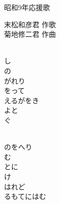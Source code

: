 \documentclass[10pt,b5j]{tarticle} %
\begin{document}
\begin{minipage}[c]{0.7\hsize} %
    \begin{center}
        {\LARGE
            昭和9年応援歌 %
        }
        {\small 
        }
    \end{center}
\end{minipage}
\begin{minipage}[c]{0.3\hsize} %
    \begin{flushright} %
        末松和彦君 作歌\\菊地修二君 作曲 %
    \end{flushright}
\end{minipage}

\vspace{1.5em} %
\newcommand{\linespace}{0.5em} %
\newcommand{\blocksize}{0.5\hsize} %
\newcommand{\itemmargin}{6em} %
\begin{enumerate} %
    \setlength{\itemindent}{\itemmargin} %
    \begin{minipage}[c]{\blocksize}
    
        \vspace{\linespace}
        \item~\\
        し\\
        の\\
        がれり\\
        をって\\
        えるがをき\\
        よと\\
        ぐ
        
        \vspace{\linespace}
        \item~\\
        のをへり\\
        む\\
        とに\\
        け\\
        はれど\\
        るもてにはむ
    
    \end{minipage}
\end{enumerate} %
\end{document}
